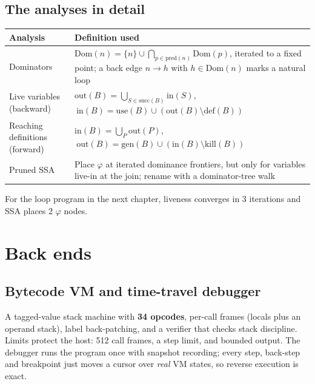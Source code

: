 \documentclass[11pt,a4paper]{article}
\begin{document}
\subsection{The analyses in detail}
\begin{center}\small
\begin{tabularx}{\linewidth}{@{}l X@{}}\toprule
\textbf{Analysis}&\textbf{Definition used}\\\midrule
Dominators&$\mathrm{Dom}(n)=\{n\}\cup\bigcap_{p\in\mathrm{pred}(n)}\mathrm{Dom}(p)$, iterated to a fixed point; a back edge $n\to h$ with $h\in\mathrm{Dom}(n)$ marks a natural loop\\
Live variables (backward)&$\mathrm{out}(B)=\bigcup_{S\in\mathrm{succ}(B)}\mathrm{in}(S)$, $\ \mathrm{in}(B)=\mathrm{use}(B)\cup(\mathrm{out}(B)\setminus\mathrm{def}(B))$\\
Reaching definitions (forward)&$\mathrm{in}(B)=\bigcup_{P}\mathrm{out}(P)$, $\ \mathrm{out}(B)=\mathrm{gen}(B)\cup(\mathrm{in}(B)\setminus\mathrm{kill}(B))$\\
Pruned SSA&Place $\varphi$ at iterated dominance frontiers, but only for variables live-in at the join; rename with a dominator-tree walk\\\bottomrule
\end{tabularx}
\end{center}
For the loop program in the next chapter, liveness converges in 3 iterations and SSA places 2 $\varphi$ nodes.

\section{Back ends}
\subsection{Bytecode VM and time-travel debugger}
A tagged-value stack machine with \textbf{34 opcodes}, per-call frames (locals plus an operand stack), label back-patching, and a verifier that checks stack discipline. Limits protect the host: 512 call frames, a step limit, and bounded output. The debugger runs the program once with snapshot recording; every step, back-step and breakpoint just moves a cursor over \emph{real} VM states, so reverse execution is exact.
\end{document}
